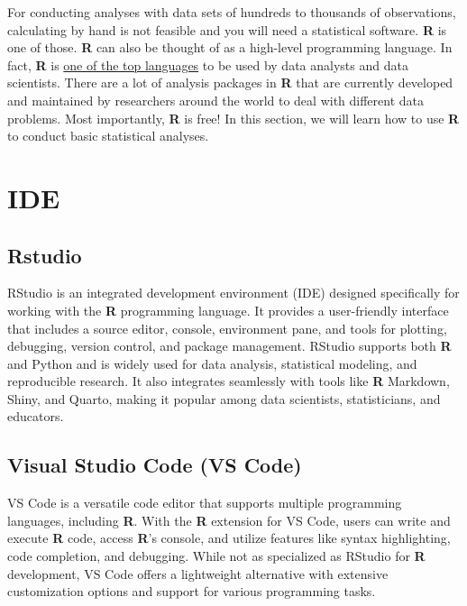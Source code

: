 \documentclass[
  letterpaper,
  DIV=11,
  numbers=noendperiod]{scrreprt}
\begin{document}
For conducting analyses with data sets of hundreds to thousands of
observations, calculating by hand is not feasible and you will need a
statistical software. \textbf{R} is one of those. \textbf{R} can also be
thought of as a high-level programming language. In fact, \textbf{R} is
\href{https://statisticstimes.com/tech/top-computer-languages.php}{one
of the top languages} to be used by data analysts and data scientists.
There are a lot of analysis packages in \textbf{R} that are currently
developed and maintained by researchers around the world to deal with
different data problems. Most importantly, \textbf{R} is free! In this
section, we will learn how to use \textbf{R} to conduct basic
statistical analyses.

\section{IDE}\label{ide}

\subsection{Rstudio}\label{rstudio}

RStudio is an integrated development environment (IDE) designed
specifically for working with the \textbf{R} programming language. It
provides a user-friendly interface that includes a source editor,
console, environment pane, and tools for plotting, debugging, version
control, and package management. RStudio supports both \textbf{R} and
Python and is widely used for data analysis, statistical modeling, and
reproducible research. It also integrates seamlessly with tools like
\textbf{R} Markdown, Shiny, and Quarto, making it popular among data
scientists, statisticians, and educators.

\subsection{Visual Studio Code (VS
Code)}\label{visual-studio-code-vs-code}

VS Code is a versatile code editor that supports multiple programming
languages, including \textbf{R}. With the \textbf{R} extension for VS
Code, users can write and execute \textbf{R} code, access \textbf{R}'s
console, and utilize features like syntax highlighting, code completion,
and debugging. While not as specialized as RStudio for \textbf{R}
development, VS Code offers a lightweight alternative with extensive
customization options and support for various programming tasks.
\end{document}
